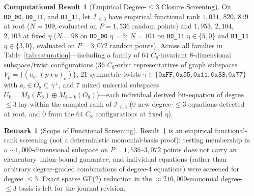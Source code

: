 \documentclass[11pt,a4paper]{article}
\theoremstyle{definition}
\newtheorem{compresult}[theorem]{Computational Result}
\newtheorem{remark}[theorem]{Remark}
\begin{document}
\begin{compresult}[Empirical Degree-$\le 3$ Closure Screening]
\label{res:closure}
On \texttt{B0\_00}, \texttt{B0\_11}, and \texttt{B1\_11}, let $\mathcal{I}_{\le 3}$ have empirical functional rank $1{,}031$, $820$, $819$ at root ($N=109$, evaluated on $P=1{,}536$ random points) and $1{,}953$, $2{,}104$, $2{,}103$ at fixed $\eta$ ($N=98$ on \texttt{B0\_00} $\eta=5$; $N=101$ on \texttt{B0\_11} $\eta \in \{5,0\}$ and \texttt{B1\_11} $\eta \in \{3,0\}$, evaluated on $P=3{,}072$ random points). Across all families in Table~\ref{tab:saturation}—including a family of $64$ $C_8$-invariant $8$-dimensional subspace/twist configurations ($36$ $C_8$-orbit representatives of graph subspaces $V_p = \{(u_e, (p \star u)_o)\}$, $21$ symmetric twists $\gamma \in \{\texttt{0xFF}, \texttt{0x55}, \texttt{0x11}, \texttt{0x33}, \texttt{0x77}\}$ with $a_i \in O_8 \subseteq \gamma^\perp$, and $7$ mixed uniserial subspaces $U_k = M_k(E_8) \oplus M_{8-k}(O_8)$)—each individual derived bit-equation of degree $\le 3$ lay within the sampled rank of $\mathcal{I}_{\le 3}$ ($0$ new degree-$\le 3$ equations detected at root, and $0$ from the $64$ $C_8$ configurations at fixed $\eta$).
\end{compresult}

\begin{remark}[Scope of Functional Screening]
Result~\ref{res:closure} is an empirical functional-rank screening (not a deterministic monomial-basis proof): testing membership in a $\sim 1{,}000$-dimensional subspace on $P = 1{,}536$--$3{,}072$ points does not carry an elementary union-bound guarantee, and individual equations (rather than arbitrary degree-graded combinations of degree-$4$ equations) were screened for degree $\le 3$. Exact sparse GF(2) reduction in the $\approx 216{,}000$-monomial degree-$\le 3$ basis is left for the journal revision.
\end{remark}
\end{document}
